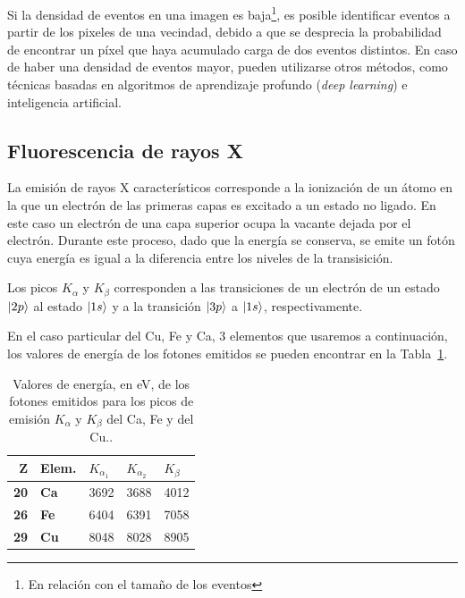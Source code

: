 \documentclass[twoside,twocolumn]{article}
\DeclarePairedDelimiter\ket{\lvert}{\rangle}
\begin{document}
      Si la densidad de eventos en una imagen es baja\footnote{En relación con el tamaño de los eventos},
      es posible identificar eventos a partir de los pixeles de una vecindad,
      debido a que se desprecia la probabilidad de encontrar un píxel que haya acumulado carga de dos eventos distintos.
      En caso de haber una densidad de eventos mayor, pueden utilizarse otros métodos, como técnicas basadas en
      algoritmos de aprendizaje profundo (\emph{deep learning}) e inteligencia artificial. \cite{ROE2005577} 
      
    \subsection{Fluorescencia de rayos X}\label{sec:intro:peaks}

      La emisión de rayos X característicos corresponde a la ionización de un átomo en la que un
      electrón de las primeras capas es excitado a un estado no ligado.
      En este caso un electrón de una capa superior ocupa la vacante dejada por el electrón.
      Durante este proceso, dado que la energía se conserva, se emite un fotón
      cuya energía es igual a la diferencia entre los niveles de la transisición.

      Los picos $K_\alpha$ y $K_\beta$ corresponden a las transiciones de un electrón de un estado
      $\ket{2p}$ al estado $\ket{1s}$ y a la transición $\ket{3p}$ a $\ket{1s}$, respectivamente.
      
      En el caso particular del Cu, Fe y Ca, 3 elementos que usaremos a continuación,
      los valores de energía de los fotones emitidos se pueden encontrar
      en la Tabla~\ref{tab:xraypeaks}.

      \begin{table}[h]
        \centering
        \begin{tabular}{|rl|ll|l|} \hline
        \textbf{Z}  & \textbf{\small{Elem.}} & $K_{\alpha_1}$ & $K_{\alpha_2}$ & $K_\beta$ \\ \hline
        \textbf{20} & \textbf{Ca}       & 3692         & 3688         & 4012        \\
        \textbf{26} & \textbf{Fe}       & 6404         & 6391         & 7058        \\
        \textbf{29} & \textbf{Cu}       & 8048         & 8028         & 8905       \\ \hline
        \end{tabular}
        \caption{Valores de energía, en eV, de los fotones emitidos para los picos de emisión 
          $K_{\alpha}$ y $K_{\beta}$ del Ca, Fe y del Cu.\cite{xraybooklet}.}
        \label{tab:xraypeaks}
        \end{table}
\end{document}
